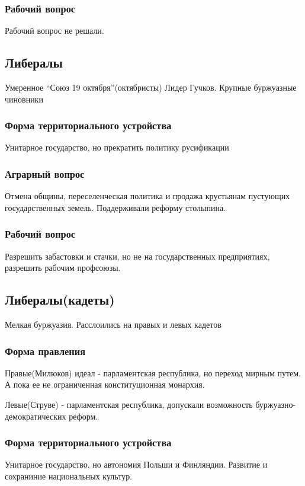 \documentclass[a4paper]{article}
\begin{document}
\subsubsection{Рабочий вопрос}
Рабочий вопрос не решали.


\subsection{Либералы}
Умеренное
``Союз 19 октября''(октябристы) Лидер Гучков. Крупные буржуазные чиновники

\subsubsection{Форма территориального устройства}
Унитарное государство, но прекратить политику русификации
\subsubsection{Аграрный вопрос}
Отмена общины, переселенческая политика и продажа крустьянам пустующих государственных земель. Поддерживали реформу столыпина.
\subsubsection{Рабочий вопрос}
Разрешить забастовки и стачки, но не на государственных предприятиях, разрешить рабочим профсоюзы.


\subsection{Либералы(кадеты)}
Мелкая буржуазия.
Расслоились на правых и левых кадетов

\subsubsection{Форма правления}

Правые(Милюков) идеал - парламентская республика, но переход мирным путем. А пока ее не ограниченная конституционная монархия.

Левые(Струве) - парламентская республика, допускали возможность буржуазно-демократических реформ.

\subsubsection{Форма территориального устройства}

Унитарное государство, но автономия Польши и Финляндии. Развитие и сохраниние национальных культур.
\end{document}
